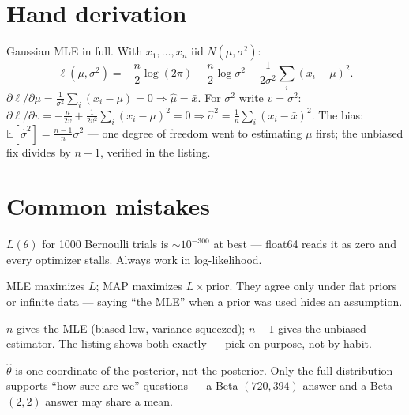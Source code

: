 \section{Hand derivation}\label{sec:handderiv13}

Gaussian MLE in full. With $x_1,\dots,x_n$ iid $N(\mu,\sigma^{2})$:
\[
\ell(\mu,\sigma^{2})=-\frac{n}{2}\log(2\pi)
-\frac{n}{2}\log\sigma^{2}-\frac1{2\sigma^{2}}\sum_i(x_i-\mu)^{2}.
\]
$\partial\ell/\partial\mu=\frac1{\sigma^{2}}\sum_i(x_i-\mu)=0
\Rightarrow\hat\mu=\bar x$. For $\sigma^{2}$ write $v=\sigma^{2}$:
$\partial\ell/\partial v=-\frac{n}{2v}+\frac{1}{2v^{2}}\sum_i
(x_i-\mu)^{2}=0\Rightarrow\hat\sigma^{2}=\frac1n\sum_i(x_i-\bar x)^{2}$.
The bias: $\mathbb E[\hat\sigma^{2}]=\frac{n-1}{n}\sigma^{2}$ ---
one degree of freedom went to estimating $\mu$ first; the unbiased fix
divides by $n-1$, verified in the listing.

\section{Common mistakes}\label{sec:stats-mistakes}

\begin{tripwire}
$L(\theta)$ for 1000 Bernoulli trials is $\sim10^{-300}$ at best ---
float64 reads it as zero and every optimizer stalls. Always work in
log-likelihood.
\end{tripwire}

\begin{tripwire}
MLE maximizes $L$; MAP maximizes $L\times$prior. They agree only under
flat priors or infinite data --- saying ``the MLE'' when a prior was
used hides an assumption.
\end{tripwire}

\begin{tripwire}
$n$ gives the MLE (biased low, variance-squeezed); $n-1$ gives the
unbiased estimator. The listing shows both exactly --- pick on purpose,
not by habit.
\end{tripwire}

\begin{tripwire}
$\hat\theta$ is one coordinate of the posterior, not the posterior.
Only the full distribution supports ``how sure are we'' questions ---
a Beta $(720,394)$ answer and a Beta $(2,2)$ answer may share a mean.
\end{tripwire}

